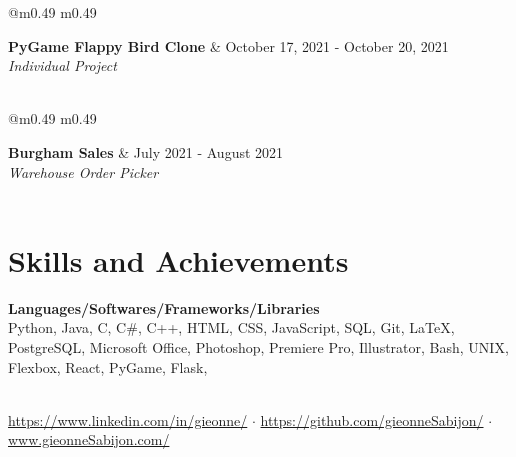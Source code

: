 \documentclass{article}
\begin{document}
\begin{center}
\vspace{5mm}

\begin{tabular*}{\textwidth}{@{\extracolsep{\fill}}m{} m{}}

    \textbf{PyGame Flappy Bird Clone} & \hfill October 17, 2021 - October 20, 2021\\
    \textit{Individual Project}\\
    \\

\end{tabular*}

\vspace{5mm}

\begin{tabular*}{\textwidth}{@{\extracolsep{\fill}}m{} m{}}

    \textbf{Burgham Sales} & \hfill July 2021 - August 2021\\
    \textit{Warehouse Order Picker}\\
    \\

\end{tabular*}

\section*{Skills and Achievements}
\end{center}

\begin{flushleft}
\textbf{Languages/Softwares/Frameworks/Libraries}\\
Python, Java, C, C\#, C++, HTML, CSS, JavaScript, SQL, Git, LaTeX, PostgreSQL, Microsoft Office, Photoshop, Premiere Pro, Illustrator, Bash, UNIX, Flexbox, React, PyGame, Flask, 

\end{flushleft}

\vspace*{\fill}

\begin{center}
	\noindent\hrulefill\\
	{\small \url{https://www.linkedin.com/in/gieonne/} $\cdot$ \url{https://github.com/gieonneSabijon/} $\cdot$ \url{www.gieonneSabijon.com/}}
\end{center}
\end{document}
